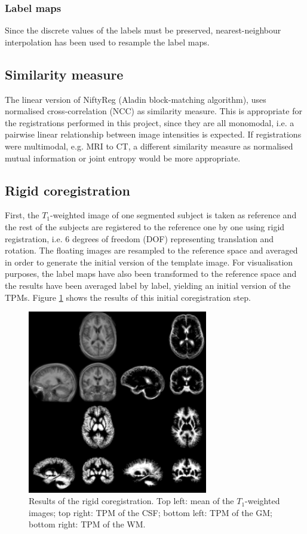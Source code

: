 \subsubsection{Label maps} Since the discrete values of the labels must be preserved, nearest-neighbour interpolation has been used to resample the label maps.



\subsection{Similarity measure}
The linear version of NiftyReg (Aladin block-matching algorithm), uses normalised cross-correlation (NCC) as similarity measure. This is appropriate for the registrations performed in this project, since they are all monomodal, i.e. a pairwise linear relationship between image intensities is expected. If registrations were multimodal, e.g. MRI to CT, a different similarity measure as normalised mutual information or joint entropy would be more appropriate.



\subsection{Rigid coregistration}
First, the $T_1$-weighted image of one segmented subject is taken as reference and the rest of the subjects are registered to the reference one by one using rigid registration, i.e. 6 degrees of freedom (DOF) representing translation and rotation. The floating images are resampled to the reference space and averaged in order to generate the initial version of the template image. For visualisation purposes, the label maps have also been transformed to the reference space and the results have been averaged label by label, yielding an initial version of the TPMs. Figure \ref{fig:template-rigid} shows the results of this initial coregistration step.

\begin{figure}
  \centering
  \includegraphics[width=0.7\textwidth]{figures/rigid_template_collage}
  \caption{Results of the rigid coregistration. Top left: mean of the $T_1$-weighted images; top right: TPM of the CSF; bottom left: TPM of the GM; bottom right: TPM of the WM.}
  \label{fig:template-rigid}
\end{figure}

